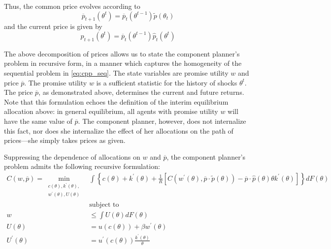 \documentclass[11pt]{article}
\begin{document}
Thus, the common price evolves according to 
\begin{equation}
\overline{p}_{t+1}\left(\theta^{t}\right)=\overline{p}_{t}\left(\theta^{t-1}\right)\tilde{p}\left(\theta_{t}\right)
\end{equation}
and the current price is given by 
\begin{equation}
p_{t+1}\left(\theta^{t}\right)=\overline{p}_{t}\left(\theta^{t-1}\right)\hat{p}_{t}\left(\theta^{t}\right)
\end{equation}

The above decomposition of prices allows us to state the component planner's problem in recursive form, in a manner which captures the homogeneity of the sequential problem in \eqref{eq:cpp_seq}. The state variables
are promise utility $w$ and price $\overline{p}$. The promise utility
$w$ is a sufficient statistic for the history of shocks $\theta^{t}$.
The price $\overline{p}$, as demonstrated above, determines the current
and future returns. Note that this formulation echoes the definition of the interim equilibrium allocation above: in general equilibrium, all agents with promise utility \( w \) will have the same value of $\overline{p}$. The component planner, however, does not internalize this fact, nor does she internalize the effect of her allocations on the path of prices---she simply takes prices as given. 

Suppressing the dependence of allocations on $w$ and $\overline{p}$,
the component planner's problem admits the following recursive formulation: 
\begin{align}
C(w,\overline{p})=\min_{\substack{c(\theta),k^{\prime}(\theta),\\
w^{\prime}(\theta),U(\theta)
}
} & \int\left\{ c\left(\theta\right)+k^{\prime}\left(\theta\right)+\frac{1}{R}\left[C\left(w^{\prime}\left(\theta\right),\overline{p}\cdot\tilde{p}\left(\theta\right)\right)-\overline{p}\cdot\hat{p}\left(\theta\right)\theta k^{\prime}\left(\theta\right)\right]\right\} dF\left(\theta\right)\label{eq:dyn_cmp}\\
 & \text{subject to}\nonumber \\
w & \le  \int U(\theta)dF(\theta)\label{eq:dyn_pkc}\\
U(\theta) & =u\left(c(\theta)\right)+\beta w^{\prime}(\theta)\\
U^{\prime}(\theta) & =u^{\prime}\left(c(\theta)\right)\frac{k^{\prime}(\theta)}{\theta}\label{eq:dyn_lic}
\end{align}
\end{document}
